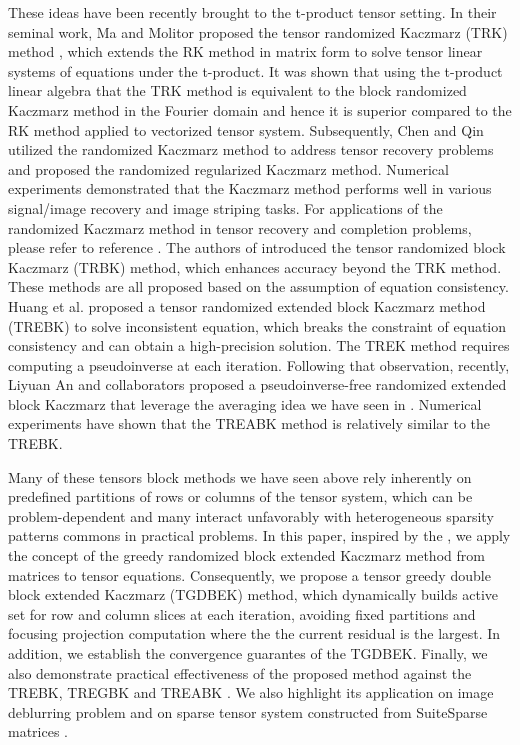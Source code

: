 \documentclass[11pt]{article}
\newcommand{\comment}[1]{}
\begin{document}
These ideas have been recently brought to the t-product tensor setting. \comment{In fact}In their seminal work, Ma and Molitor \cite{molitor2022} proposed  the tensor randomized Kaczmarz (TRK) method , which extends the RK method in matrix form to solve tensor linear systems of equations under the t-product. It was shown that using the t-product linear algebra that the TRK method  is equivalent to the block randomized Kaczmarz method in the Fourier domain and hence it is superior compared to the  RK  method applied to vectorized tensor system. Subsequently, Chen and Qin\cite{chen2021} utilized the randomized Kaczmarz method to address tensor recovery problems and proposed the randomized regularized Kaczmarz method. Numerical experiments demonstrated that the Kaczmarz method performs well in various signal/image recovery and image striping tasks. For applications of the randomized Kaczmarz method in tensor recovery and completion problems, please refer to reference \cite{chen2021,wang2022, wang2023, lia2024, zhang2024}. The authors of \cite{ba02020TRB} introduced the tensor randomized block Kaczmarz (TRBK) method, which enhances accuracy beyond the TRK method. These methods are all proposed based on the assumption of equation consistency. Huang et al. \cite{huang2023TREK} proposed a tensor randomized extended block Kaczmarz method (TREBK) to solve inconsistent equation, which breaks the constraint of equation consistency and can obtain a high-precision solution. The TREK method requires computing a pseudoinverse at each iteration. Following that observation, recently,  Liyuan An and collaborators \cite{lian2024TREABK} proposed a pseudoinverse-free randomized extended block Kaczmarz that  leverage the averaging idea  we have seen in \cite{necoara2019faste, du2020rando}. Numerical experiments have shown that the TREABK method is relatively similar to the TREBK. 

Many of these tensors block methods we have seen above \cite{lian2024TREABK, ba02020TRB} rely inherently on predefined partitions of  rows or columns of the tensor system, which can be problem-dependent and many interact unfavorably with heterogeneous sparsity patterns commons in practical problems.  In this paper, inspired by the \cite{su2025}, we apply the concept of the greedy randomized block  extended Kaczmarz method
from matrices to tensor equations. Consequently,  we propose a tensor greedy double block extended Kaczmarz (TGDBEK) method, which dynamically builds active set for row and column slices at each iteration, avoiding fixed partitions and focusing  projection computation where the  the current residual is the largest. In addition, we establish the convergence guarantes of the TGDBEK. Finally, we also demonstrate practical effectiveness of the proposed method against the TREBK, TREGBK \cite{huang2023TREK} and TREABK \cite{su2025}. We also highlight its application on image deblurring problem and on sparse  tensor system constructed from  SuiteSparse matrices \cite{suiteSparse}.
\end{document}
